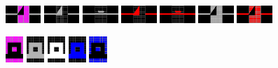 \documentclass[12pt,a4paper]{article}
\begin{document}
\begin{enumerate}[leftmargin=*]
\includegraphics[width=0.1\textwidth]{symboly/vyk19.png}
\includegraphics[width=0.1\textwidth]{symboly/vyk1.png}
\includegraphics[width=0.1\textwidth]{symboly/vyk2.png}
\includegraphics[width=0.1\textwidth]{symboly/vyk3.png}
\includegraphics[width=0.1\textwidth]{symboly/vyk4.png}
\includegraphics[width=0.1\textwidth]{symboly/vyk5.png}
\includegraphics[width=0.1\textwidth]{symboly/vyk6.png}

\includegraphics[width=0.05\textwidth]{symboly/ez6.png}
\includegraphics[width=0.05\textwidth]{symboly/ez1.png}
\includegraphics[width=0.05\textwidth]{symboly/ez2.png}
\includegraphics[width=0.05\textwidth]{symboly/ez3.png}
\includegraphics[width=0.05\textwidth]{symboly/ez5.png}


\end{enumerate}
\end{document}
